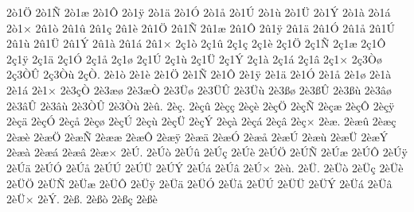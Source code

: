 {2^^f21^^d6
2^^f21^^d1
2^^f21^^e6
2^^f21^^d4
2^^f21^^ff
2^^f21^^e4
2^^f21^^d3
2^^f21^^e5
2^^f21^^da
2^^f21^^f9
2^^f21^^dc
2^^f21^^dd
2^^f21^^e0
2^^f21^^e1
2^^f21^^d7
2^^fb1^^f2
2^^fb1^^fb
2^^fb1^^e7
2^^fb1^^e8
2^^fb1^^d6
2^^fb1^^d1
2^^fb1^^e6
2^^fb1^^d4
2^^fb1^^ff
2^^fb1^^e4
2^^fb1^^d3
2^^fb1^^e5
2^^fb1^^da
2^^fb1^^f9
2^^fb1^^dc
2^^fb1^^dd
2^^fb1^^e0
2^^fb1^^e1
2^^fb1^^d7
2^^e71^^f2
2^^e71^^fb
2^^e71^^e7
2^^e71^^e8
2^^e71^^d6
2^^e71^^d1
2^^e71^^e6
2^^e71^^d4
2^^e71^^ff
2^^e71^^e4
2^^e71^^d3
2^^e71^^e5
2^^e71^^f8
2^^e71^^da
2^^e71^^f9
2^^e71^^dc
2^^e71^^dd
2^^e71^^e0
2^^e71^^e1
2^^e71^^e2
2^^e71^^d7
2^^e73^^d2^^f8
2^^e73^^d2^^db
2^^e73^^d2^^f9
2^^e7^^d2.
2^^e81^^f2
2^^e81^^e8
2^^e81^^d6
2^^e81^^d1
2^^e81^^d4
2^^e81^^ff
2^^e81^^e4
2^^e81^^d3
2^^e81^^e5
2^^e81^^f8
2^^e81^^e0
2^^e81^^e1
2^^e81^^d7
2^^e83^^e7^^d2
2^^e83^^e6^^f8
2^^e83^^e6^^d2
2^^e83^^dc^^f8
2^^e83^^dc^^db
2^^e83^^dc^^f9
2^^e83^^df^^f8
2^^e83^^df^^db
2^^e83^^df^^f9
2^^e83^^e2^^f8
2^^e83^^e2^^db
2^^e83^^e2^^f9
2^^e83^^d2^^db
2^^e83^^d2^^f9
2^^e8^^fb.
2^^e8^^e7.
2^^e8^^e7^^fb
2^^e8^^e7^^e7
2^^e8^^e7^^e8
2^^e8^^e7^^d6
2^^e8^^e7^^d1
2^^e8^^e7^^e6
2^^e8^^e7^^d4
2^^e8^^e7^^ff
2^^e8^^e7^^e4
2^^e8^^e7^^d3
2^^e8^^e7^^e5
2^^e8^^e7^^f8
2^^e8^^e7^^da
2^^e8^^e7^^f9
2^^e8^^e7^^dc
2^^e8^^e7^^dd
2^^e8^^e7^^e0
2^^e8^^e7^^e1
2^^e8^^e7^^e2
2^^e8^^e7^^d7
2^^e8^^e6.
2^^e8^^e6^^fb
2^^e8^^e6^^e7
2^^e8^^e6^^e8
2^^e8^^e6^^d6
2^^e8^^e6^^d1
2^^e8^^e6^^e6
2^^e8^^e6^^d4
2^^e8^^e6^^ff
2^^e8^^e6^^e4
2^^e8^^e6^^d3
2^^e8^^e6^^e5
2^^e8^^e6^^da
2^^e8^^e6^^f9
2^^e8^^e6^^dc
2^^e8^^e6^^dd
2^^e8^^e6^^e0
2^^e8^^e6^^e1
2^^e8^^e6^^e2
2^^e8^^e6^^d7
2^^e8^^da.
2^^e8^^da^^f2
2^^e8^^da^^fb
2^^e8^^da^^e7
2^^e8^^da^^e8
2^^e8^^da^^d6
2^^e8^^da^^d1
2^^e8^^da^^e6
2^^e8^^da^^d4
2^^e8^^da^^ff
2^^e8^^da^^e4
2^^e8^^da^^d3
2^^e8^^da^^e5
2^^e8^^da^^da
2^^e8^^da^^dc
2^^e8^^da^^dd
2^^e8^^da^^e1
2^^e8^^da^^e2
2^^e8^^da^^d7
2^^e8^^f9.
2^^e8^^dc.
2^^e8^^dc^^f2
2^^e8^^dc^^e7
2^^e8^^dc^^e8
2^^e8^^dc^^d6
2^^e8^^dc^^d1
2^^e8^^dc^^e6
2^^e8^^dc^^d4
2^^e8^^dc^^ff
2^^e8^^dc^^e4
2^^e8^^dc^^d3
2^^e8^^dc^^e5
2^^e8^^dc^^da
2^^e8^^dc^^dc
2^^e8^^dc^^dd
2^^e8^^dc^^e1
2^^e8^^dc^^e2
2^^e8^^dc^^d7
2^^e8^^dd.
2^^e8^^df.
2^^e8^^df^^f2
2^^e8^^df^^e7
2^^e8^^df^^e8
}
